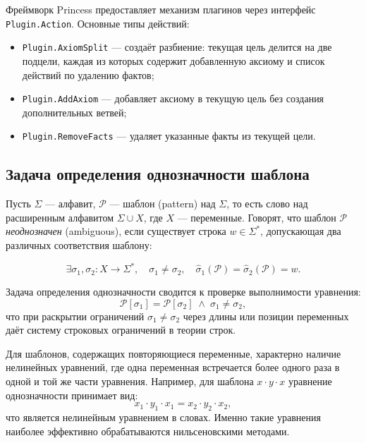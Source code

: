 \documentclass[14pt, russian]{scrartcl}
\begin{document}
Фреймворк Princess предоставляет механизм плагинов через интерфейс
\texttt{Plugin.Action}. Основные типы действий:

\begin{itemize}
\item \texttt{Plugin.AxiomSplit} --- создаёт разбиение: текущая цель делится на две
  подцели, каждая из которых содержит добавленную аксиому и список действий по удалению
  фактов;
\item \texttt{Plugin.AddAxiom} --- добавляет аксиому в текущую цель без создания
  дополнительных ветвей;
\item \texttt{Plugin.RemoveFacts} --- удаляет указанные факты из текущей цели.
\end{itemize}

\subsection{Задача определения однозначности шаблона}

Пусть $\Sigma$ --- алфавит, $\mathcal{P}$ --- шаблон (pattern) над $\Sigma$, то есть слово
над расширенным алфавитом $\Sigma \cup X$, где $X$ --- переменные. Говорят, что шаблон
$\mathcal{P}$ \emph{неоднозначен} (ambiguous), если существует строка $w \in \Sigma^*$,
допускающая два различных соответствия шаблону:

\begin{equation}
\exists \sigma_1, \sigma_2 : X \to \Sigma^*,\quad \sigma_1 \neq \sigma_2,\quad
\hat{\sigma}_1(\mathcal{P}) = \hat{\sigma}_2(\mathcal{P}) = w.
\end{equation}

Задача определения однозначности сводится к проверке выполнимости уравнения:
\begin{equation}
\mathcal{P}[\sigma_1] = \mathcal{P}[\sigma_2] \;\wedge\; \sigma_1 \neq \sigma_2,
\end{equation}
что при раскрытии ограничений $\sigma_1 \neq \sigma_2$ через длины или позиции переменных
даёт систему строковых ограничений в теории строк.

Для шаблонов, содержащих повторяющиеся переменные, характерно наличие нелинейных уравнений,
где одна переменная встречается более одного раза в одной и той же части уравнения. Например, для шаблона
$x \cdot y \cdot x$ уравнение однозначности принимает вид:
\begin{equation}
x_1 \cdot y_1 \cdot x_1 = x_2 \cdot y_2 \cdot x_2,
\end{equation}
что является нелинейным уравнением в словах. Именно такие уравнения наиболее
эффективно обрабатываются нильсеновскими методами.
\end{document}
